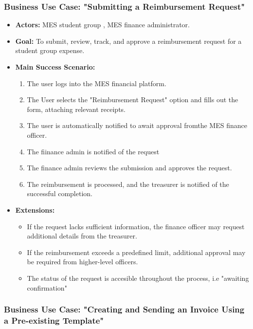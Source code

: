 \documentclass[12pt]{article}
\begin{document}
\subsubsection{\textbf{Business Use Case:} "Submitting a Reimbursement Request"}
\begin{itemize}
    \item \textbf{Actors:} MES student group , MES finance administrator.
    \item \textbf{Goal:} To submit, review, track, and approve a reimbursement request for a student group expense.
    \item \textbf{Main Success Scenario:} 
    \begin{enumerate}
        \item The user logs into the MES financial platform.
        \item The User selects the "Reimbursement Request" option and fills out the form, attaching relevant receipts.
        \item The user is automatically notified to await approval fromthe MES finance officer.
        \item The fiinance admin is notified of the request
        \item The finance admin reviews the submission and approves the request.
        \item The reimbursement is processed, and the treasurer is notified of the successful completion.
    \end{enumerate}
    \item \textbf{Extensions:} 
    \begin{itemize}
        \item If the request lacks sufficient information, the finance officer may request additional details from the treasurer. 
        \item If the reimbursement exceeds a predefined limit, additional approval may be required from higher-level officers.
        \item The status of the request is accesible throughout the process, i.e "awaiting confirmation"
    \end{itemize}
\end{itemize}

\subsubsection{\textbf{Business Use Case:} "Creating and Sending an Invoice Using a Pre-existing Template"}
\end{document}
